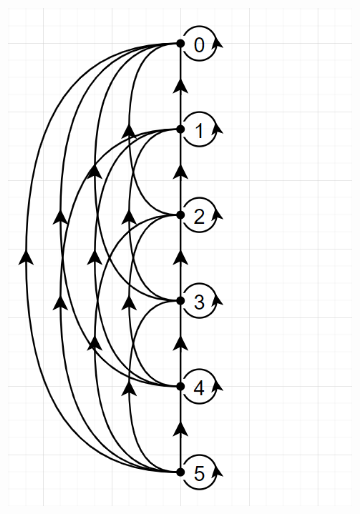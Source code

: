 \documentclass[a4 paper]{article}
\numberwithin{equation}{section}
\newcommand{\0}{\mathbf{0}}
\begin{document}
\begin{itemize}
\begin{figure}[h]
\begin{subfigure}[b]{0.3\textwidth}
            \includegraphics[width=\textwidth]{q1_hassediagram1.png}
            \caption{}
        \end{subfigure}
        \begin{subfigure}[b]{0.3\textwidth}

\end{subfigure}
\end{figure}
\end{itemize}
\end{document}
